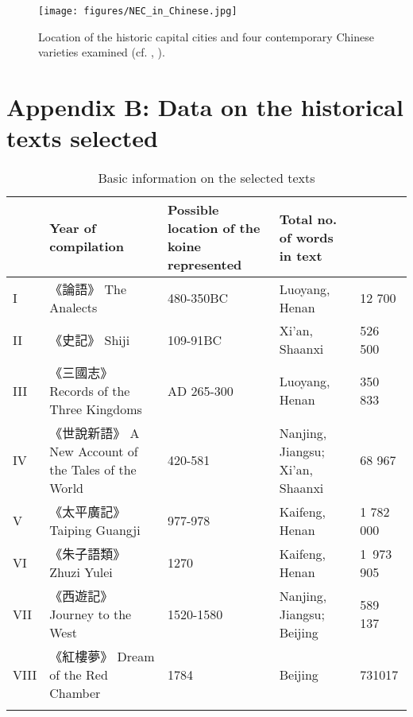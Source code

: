\documentclass[output=paper]{langscibook}
\begin{document}
\clearpage

\begin{figure} 
  \texttt{[image: figures/NEC\_in\_Chinese.jpg]}
  \caption{Location of the historic capital cities and four contemporary Chinese varieties examined (cf. \citet{Zhou1995}, \citet{Wan1958}).}
  \label{fig:lamCapitals}
\end{figure}



\clearpage
\section*{Appendix \hypertarget{app:lamB}{B}: Data on the historical texts selected}

\begin{sidewaystable}
  \begin{tabularx}{\textwidth}{L{0.5cm}XL{2cm}L{3cm}L{2cm}}
    \lsptoprule
     & Year of compilation & Possible location of the koine represented & Total no. of words in text\\
     \midrule
I & 《論語》 The Analects & 480-350BC & Luoyang, Henan & 12 700\\
II	& 《史記》 Shiji & 109-91BC & Xi'an, Shaanxi & 526 500\\
III	& 《三國志》 Records of the Three Kingdoms & AD 265-300 & Luoyang, Henan & 350 833\\
IV	& 《世說新語》 A New Account of the Tales of the World & 420-581 & Nanjing, Jiangsu; Xi'an, Shaanxi & 68 967\\
V & 《太平廣記》Taiping Guangji & 977-978 & Kaifeng, Henan & 1 782 000\\
VI & 《朱子語類》 Zhuzi Yulei & 1270 & Kaifeng, Henan & 1 973 905\\
VII & 《西遊記》 Journey to the West & 1520-1580 & Nanjing, Jiangsu; Beijing & 589 137\\
VIII & 《紅樓夢》 Dream of the Red Chamber & 1784 & Beijing & 731017\\
\lspbottomrule
\end{tabularx}
  \caption{Basic information on the selected texts}
  \label{tab:lamB1}
\end{sidewaystable}
\end{document}
